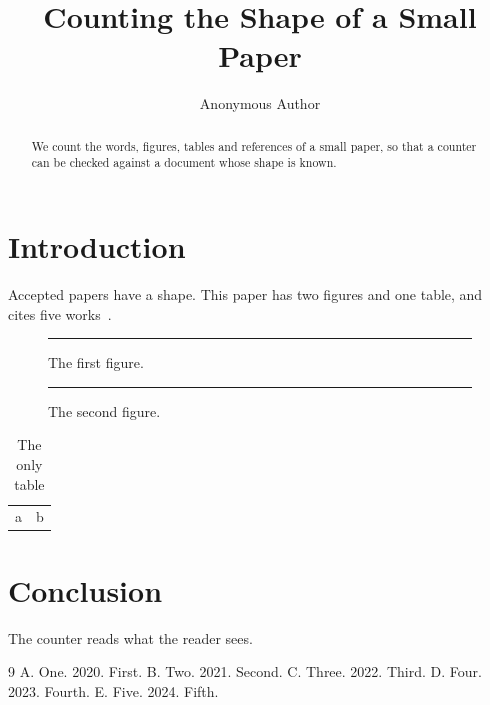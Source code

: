 \documentclass[sigconf,review,anonymous]{acmart}
\begin{document}
\title{Counting the Shape of a Small Paper}
\author{Anonymous Author}
\begin{abstract}
We count the words, figures, tables and references of a small paper, so that a counter can be
checked against a document whose shape is known.
\end{abstract}
\maketitle
\section{Introduction}
Accepted papers have a shape. This paper has two figures and one table, and cites five
works~\cite{a,b,c,d,e}.
\begin{figure}[h]\centering\rule{2cm}{1cm}\caption{The first figure.}\end{figure}
\begin{figure}[h]\centering\rule{2cm}{1cm}\caption{The second figure.}\end{figure}
\begin{table}[h]\centering\caption{The only table}\begin{tabular}{ll}a & b\\\end{tabular}\end{table}
\section{Conclusion}
The counter reads what the reader sees.
\begin{thebibliography}{9}
 A. One. 2020. First.
 B. Two. 2021. Second.
 C. Three. 2022. Third.
 D. Four. 2023. Fourth.
 E. Five. 2024. Fifth.
\end{thebibliography}
\end{document}
